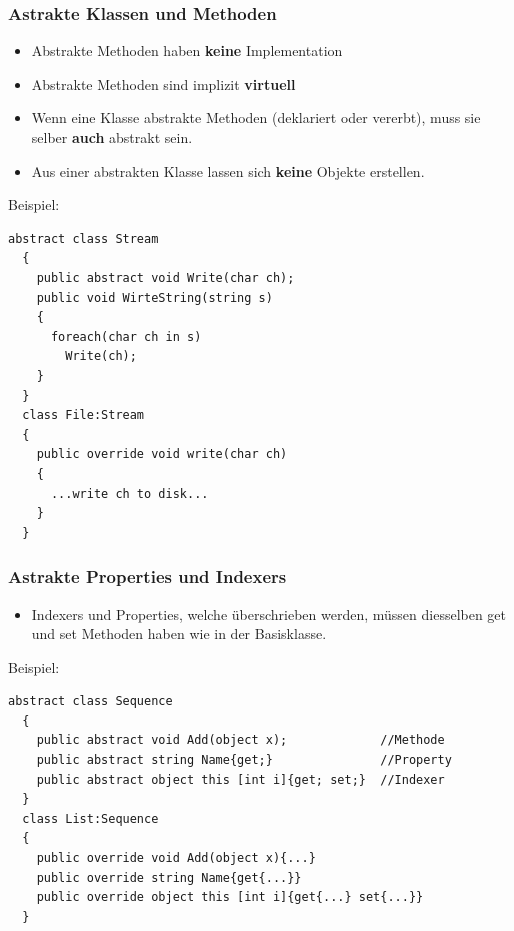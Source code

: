 \subsubsection{Astrakte Klassen und Methoden}
\begin{itemize}
  \item Abstrakte Methoden haben \textbf{keine} Implementation
  \item Abstrakte Methoden sind implizit \textbf{virtuell}
  \item Wenn eine Klasse abstrakte Methoden (deklariert oder vererbt), muss sie
  selber \textbf{auch} abstrakt sein. 
  \item Aus einer abstrakten Klasse lassen sich \textbf{keine} Objekte
  erstellen. 
\end{itemize}
Beispiel: 
\begin{lstlisting}[style=Csharp]
  abstract class Stream
  {
    public abstract void Write(char ch);
    public void WirteString(string s)
    {
      foreach(char ch in s) 
        Write(ch); 
    }
  }
  class File:Stream
  {
    public override void write(char ch)
    {
      ...write ch to disk...
    }
  }
\end{lstlisting}

\subsubsection{Astrakte Properties und Indexers}
\begin{itemize}
  \item Indexers und Properties, welche überschrieben werden, müssen diesselben
  get und set Methoden haben wie in der Basisklasse.
\end{itemize}
Beispiel: 
\begin{lstlisting}[style=Csharp]
  abstract class Sequence
  {
    public abstract void Add(object x);             //Methode
    public abstract string Name{get;}               //Property
    public abstract object this [int i]{get; set;}  //Indexer   
  }
  class List:Sequence
  {
    public override void Add(object x){...}
    public override string Name{get{...}}
    public override object this [int i]{get{...} set{...}}
  }
\end{lstlisting}

